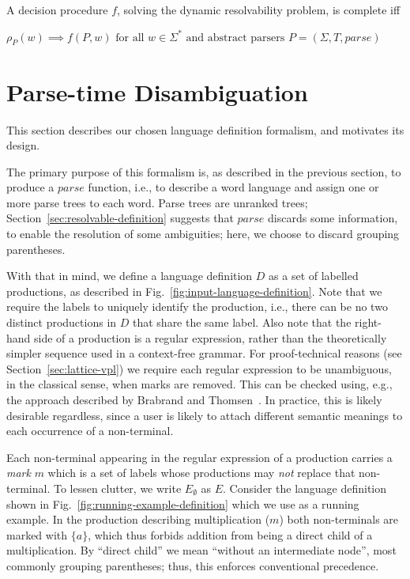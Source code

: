 \documentclass[runningheads]{llncs}
\newcommand{\T}{\Sigma} %
\newcommand{\parse}{\mathit{parse}} %
\begin{document}
\begin{definition}\label{def:dynamic-procedure-complete}
  A decision procedure $f$, solving the dynamic resolvability problem, is complete iff

  $\rho_P(w) \implies f(P, w) \text{ for all } w \in \Sigma^{*} \text{ and abstract parsers } P = (\T, T, \parse)$
\end{definition}


\section{Parse-time Disambiguation} \label{sec:parse-time-disambiguation}

This section describes our chosen language definition formalism, and motivates its design.

The primary purpose of this formalism is, as described in the previous section, to produce a $\parse$ function, i.e., to describe a word language and assign one or more parse trees to each word. Parse trees are unranked trees; Section~\ref{sec:resolvable-definition} suggests that $\parse$ discards some information, to enable the resolution of some ambiguities; here, we choose to discard grouping parentheses.

With that in mind, we define a language definition $D$ as a set of labelled productions, as described in Fig.~\ref{fig:input-language-definition}. Note that we require the labels to uniquely identify the production, i.e., there can be no two distinct productions in $D$ that share the same label. Also note that the right-hand side of a production is a regular expression, rather than the theoretically simpler sequence used in a context-free grammar. For proof-technical reasons (see Section~\ref{sec:lattice-vpl}) we require each regular expression to be unambiguous, in the classical sense, when marks are removed. This can be checked using, e.g., the approach described by Brabrand and Thomsen~\cite{brabrandTypedUnambiguousPattern2010}. In practice, this is likely desirable regardless, since a user is likely to attach different semantic meanings to each occurrence of a non-terminal.

Each non-terminal appearing in the regular expression of a production carries a \emph{mark} $m$ which is a set of labels whose productions may \emph{not} replace that non-terminal. To lessen clutter, we write $E_\emptyset$ as $E$. Consider the language definition shown in Fig.~\ref{fig:running-example-definition} which we use as a running example. In the production describing multiplication ($m$) both non-terminals are marked with $\{a\}$, which thus forbids addition from being a direct child of a multiplication. By ``direct child'' we mean ``without an intermediate node'', most commonly grouping parentheses; thus, this enforces conventional precedence.
\end{document}
